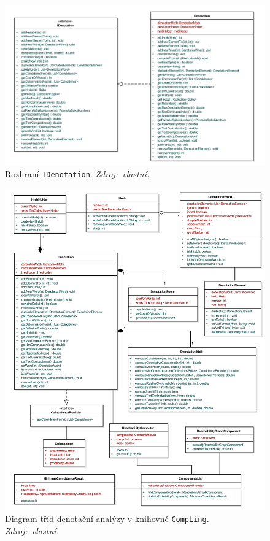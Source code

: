 \documentclass[dp.tex]{subfiles}
\begin{document}
\newpage
\begin{figure}[H]
	\centering
	\includegraphics[max width=\textwidth,keepaspectratio=true]{imgs-60-aplikace/compLing-IDenotationInterface-class-diagram}
	\caption[]{Rozhraní \texttt{IDenotation}. \textit{Zdroj:~vlastní.}}
	\label{fig:gui-idenotation-class-diagram}
\end{figure}

\newpage
\begin{figure}[H]
	\centering
	\includegraphics[max width=\textwidth,keepaspectratio=true]{imgs-60-aplikace/compLing-denotation-class-diagram}
	\caption[]{Diagram tříd denotační analýzy v knihovně \texttt{CompLing}. \textit{Zdroj:~vlastní.}}
	\label{fig:compling-denotation-class-diagram}
\end{figure}
\end{document}
